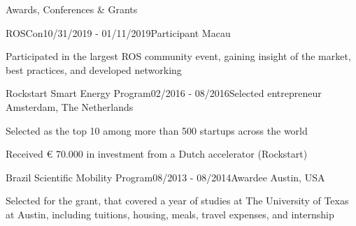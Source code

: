 \documentclass[14pt, a4paper]{resume} %
\begin{document}
\begin{rSection}{Awards, Conferences \& Grants}
\begin{rSubsection}{ROSCon}{10/31/2019 - 01/11/2019}{Participant}{ \normalfont Macau}
	\item Participated in the largest ROS community event, gaining insight of the market, best practices, and developed networking
\end{rSubsection}

\begin{rSubsection}{Rockstart Smart Energy Program}{02/2016 - 08/2016}{Selected entrepreneur}{ \normalfont Amsterdam, The Netherlands}
	\item Selected as the top 10  among more than 500 startups across the world
	\item Received € 70.000 in investment from a Dutch accelerator (Rockstart)
\end{rSubsection}

\begin{rSubsection}{Brazil Scientific Mobility Program}{08/2013 - 08/2014}{Awardee}{ \normalfont Austin, USA}
	\item Selected for the grant, that covered a year of studies at The University of Texas at Austin, including tuitions, housing, meals, travel expenses, and internship
\end{rSubsection}

\end{rSection}
\end{document}

